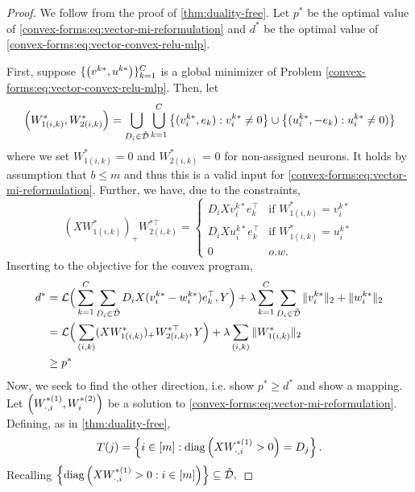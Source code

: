 \begin{proof}
    We follow from the proof of \cref{thm:duality-free}.   Let \(p^*\) be the optimal value of \eqref{convex-forms:eq:vector-mi-reformulation} and \(d^*\) be the optimal value of \eqref{convex-forms:eq:vector-convex-relu-mlp}.

    First, suppose \( \{\left(v^{k*}, u^{k*}\right)\}_{k=1}^C\) is a global minimizer of Problem \ref{convex-forms:eq:vector-convex-relu-mlp}. Then, let
    \[ \left(W_{1(i, k)}^*, W_{2(i, k)}^*\right) = \bigcup_{D_i \in \tilde {\mathcal{D}}} \bigcup_{k=1}^C \left\{(v_i^{k*}, e_k): v_i^{k*} \neq 0\right\} \cup \left\{(u_i^{k*}, -e_k): u_i^{k*} \neq 0)\right\}  \]
    where we set \(W_{1(i, k)}^* = 0\) and \(W_{2(i, k)}^*\) = 0 for non-assigned neurons. It holds by assumption that \(b \leq m\) and thus this is a valid input for \eqref{convex-forms:eq:vector-mi-reformulation}.
    Further, we have, due to the constraints,
    \begin{equation*}
        (XW_{1(i, k)}^*)_+W_{2(i, k)}^{*\top } = \begin{cases}
            D_iXv_{i}^{k*}e_k^\top & \text{if } W_{1(i, k)}^* = v_i^{k*} \\
            D_iXu_{i}^{k*}e_k^\top & \text{if } W_{1(i, k)}^* = u_i^{k*} \\
            0                      & o.w.
        \end{cases}
    \end{equation*}
    Inserting to the objective for the convex program,
    \begin{align}
        d^* & =\mathcal{L}\Big(\sum_{k=1}^C \sum_{D_i \in \tilde {\mathcal{D}}} D_i X (v_{i}^{k*} - w_{i}^{k*})e_k^\top, Y\Big)+\lambda\sum_{k=1}^C\sum_{D_i \in \tilde {\mathcal{D}}}\|v_{i}^{k*}\|_2+\|w_{i}^{k*}\|_2 \\
            & = \mathcal{L}\Big(\sum_{(i, k)}(XW_{1(i, k)}^*)_+W_{2(i, k)}^{*\top }, Y\Big)+\lambda\sum_{(i,k) }\|W_{1(i, k)}^*\|_2                                                                        \\  &\geq p^*
    \end{align}
    Now, we seek to find the other direction, i.e. show \(p^* \geq d^*\) and show a mapping. Let \(\left(W^{*(1)}_{\cdot, i}, W^{*(2)}_{i}\right)\) be a solution to \eqref{convex-forms:eq:vector-mi-reformulation}. Defining, as in \cref{thm:duality-free},
    \[
        T(j) = \left\{ i \in [m] : \text{diag}\left(X W^{*(1)}_{\cdot, i} > 0\right) = D_j \right\}.
    \]
    Recalling
    \( \left\{\text{diag}\left(X W^{*(1)}_{\cdot, i} > 0 : i \in [m]\right) \right\} \subseteq \tilde {\mathcal{D}}, \)

\end{proof}
